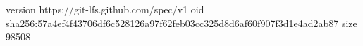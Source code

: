 version https://git-lfs.github.com/spec/v1
oid sha256:57a4ef4f43706df6c528126a97f62feb03cc325d8d6af60f907f3d1e4ad2ab87
size 98508
